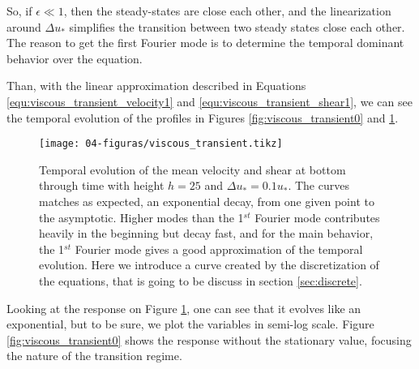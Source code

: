     So, if $\epsilon \ll 1$, then the steady-states are close each other, and the linearization around $\Delta u_*$ simplifies the transition between two steady states close each other. The reason to get the first Fourier mode is to determine the temporal dominant behavior over the equation.

    Than, with the linear approximation described in Equations \ref{equ:viscous_transient_velocity1} and \ref{equ:viscous_transient_shear1}, we can see the temporal evolution of the profiles in Figures \ref{fig:viscous_transient0} and \ref{fig:viscous_transient}.

\begin{figure}[H]
    \centering
    \texttt{[image: 04-figuras/viscous\_transient.tikz]}
    \caption[Temporal solution for viscous fluid profiles.]{Temporal evolution of the mean velocity and shear at bottom through time with height $h=25$ and $\Delta u_*=0.1 u_*$. The curves matches as expected, an exponential decay, from one given point to the asymptotic. Higher modes than the 1$^{st}$ Fourier mode contributes heavily in the beginning but decay fast, and for the main behavior, the 1$^{st}$ Fourier mode gives a good approximation of the temporal evolution. Here we introduce a curve created by the discretization of the equations, that is going to be discuss in section \ref{sec:discrete}.}
    \label{fig:viscous_transient}
\end{figure}

    Looking at the response on Figure \ref{fig:viscous_transient}, one can see that it evolves like an exponential, but to be sure, we plot the variables in semi-log scale. Figure \ref{fig:viscous_transient0} shows the response without the stationary value, focusing the nature of the transition regime.

